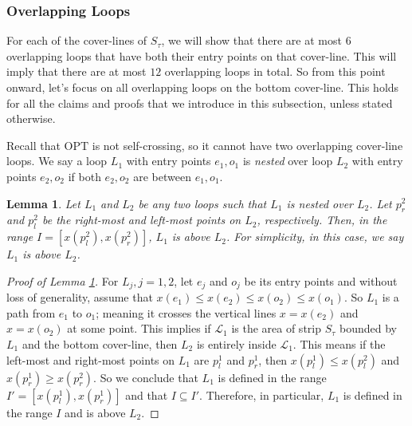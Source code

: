 \documentclass[10pt,a4paper]{amsart}
\theoremstyle{thmstyleone}
\newtheorem{lemma}{Lemma}
\newcommand{\OPT}{{\text{OPT}}}
\begin{document}
\subsubsection*{Overlapping Loops}
    
    For each of the cover-lines of $S_\tau$, we will show that there are at most $6$ overlapping loops that have both their entry points on that cover-line. This will imply that there are at most $12$ overlapping loops in total. So from this point onward, let's focus on all overlapping loops on the bottom cover-line. This holds for all the claims and proofs that we introduce in this subsection, unless stated otherwise.
    
    Recall that $\OPT$ is not self-crossing, so it cannot have two overlapping cover-line loops.
    We say a loop $L_1$ with entry points $e_1,o_1$ is {\em nested} over loop $L_2$ with entry points $e_2,o_2$
    if both $e_2,o_2$ are between $e_1,o_1$. 

\begin{lemma}\label{claim:nested-loop-above}
    Let $L_1$ and $L_2$ be any two loops such that $L_1$ is nested over $L_2$. Let $p^2_r$ and $p^2_l$ be the right-most and left-most points on $L_2$, respectively. Then, in the range $I = [x(p^2_l), x(p^2_r)]$, $L_1$ is above $L_2$. For simplicity, in this case, we say $L_1$ is above $L_2$.
\end{lemma}
\begin{proof}[Proof of Lemma \ref{claim:nested-loop-above}]
    For $L_j, j=1,2$, let $e_j$ and $o_j$ be its entry points and without loss of generality, assume that $x(e_1) \le x(e_2) \le x(o_2) \le x(o_1)$. So $L_1$ is a path  from $e_1$ to $o_1$; meaning it crosses the vertical lines $x = x(e_2)$ and $x = x(o_2)$ at some point. This implies if $\mathcal L_1$ is the area of strip $S_\tau$ bounded by $L_1$ and the bottom cover-line, then $L_2$ is entirely inside $\mathcal L_1$. This means if the left-most and right-most points on $L_1$ are $p^1_l$ and $p^1_r$, then $x(p^1_l) \le x(p^2_l)$ and $x(p^1_r) \ge x(p^2_r)$. So we conclude that $L_1$ is defined in the range $I' = [x(p^1_l), x(p^1_r)]$ and that 
    $I \subseteq I'$. Therefore, in particular, $L_1$ is defined in the range $I$ and is above $L_2$.
\end{proof}
\end{document}
